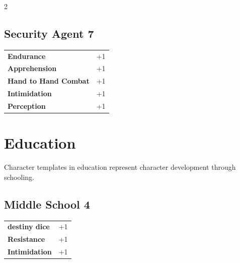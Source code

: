 \begin{multicols}{2}
\begin{tcolorbox}
\end{tcolorbox}

\begin{tcolorbox}
    \subsection*{Security Agent \hfill \small{7 }}
    \tcblower




\begin{tabular}{@{}ll@{}}
    \textbf{Endurance} & +1\\
    \textbf{Apprehension} & +1\\
    \textbf{Hand to Hand Combat} & +1\\
    \textbf{Intimidation} & +1\\
    \textbf{Perception} & +1\\
\end{tabular}


\end{tcolorbox}

\section{Education}

Character templates in education represent character development through schooling.

\begin{tcolorbox}
    \subsection*{Middle School \hfill \small{4 }}
    \tcblower




\begin{tabular}{@{}ll@{}}
    \textbf{destiny dice} & +1\\
    \textbf{Resistance} & +1\\
    \textbf{Intimidation} & +1\\
\end{tabular}


\end{tcolorbox}
\end{multicols}
